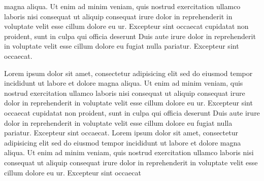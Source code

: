 \documentclass[a4paper, oneside, notitlepage, 12pt]{article}
\begin{document}
\begin{pages}
\begin{Leftside}
magna aliqua. Ut enim ad minim veniam, quis nostrud
exercitation ullamco laboris nisi
 consequat ut aliquip consequat\pend[\vskip 2ex]
 irure dolor in reprehenderit
in voluptate velit esse cillum dolore eu ur. Excepteur sint occaecat
cupidatat non proident, sunt in culpa qui officia deserunt
Duis aute irure dolor in reprehenderit
in voluptate velit esse cillum dolore eu fugiat nulla
pariatur. Excepteur sint occaecat.
\pend

Lorem ipsum dolor sit amet, consectetur adipisicing elit
sed do eiusmod tempor incididunt ut labore et dolore
magna aliqua. Ut enim ad minim veniam, quis nostrud
exercitation ullamco laboris nisi
 consequat ut aliquip consequat\pend[\vskip 2ex]
 irure dolor in reprehenderit
in voluptate velit esse cillum dolore eu ur. Excepteur sint occaecat
cupidatat non proident, sunt in culpa qui officia deserunt
Duis aute irure dolor in reprehenderit
in voluptate velit esse cillum dolore eu fugiat nulla
pariatur. Excepteur sint occaecat.
\pend
{}
Lorem ipsum dolor sit amet, consectetur adipisicing elit
sed do eiusmod tempor incididunt ut labore et dolore
magna aliqua. Ut enim ad minim veniam, quis nostrud
exercitation ullamco laboris nisi
 consequat ut aliquip consequat\pend[\vskip 2ex]
 irure dolor in reprehenderit
in voluptate velit esse cillum dolore eu ur. Excepteur sint occaecat

\end{Leftside}
\end{pages}
\end{document}
